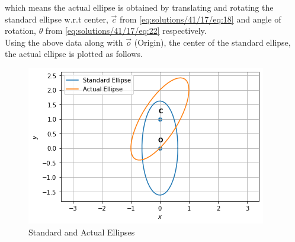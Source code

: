 which means the actual ellipse is obtained by translating and rotating the standard ellipse w.r.t center, $\vec{c}$ from \eqref{eq:solutions/41/17/eq:18} and angle of rotation, $\theta$ from \eqref{eq:solutions/41/17/eq:22} respectively.\\
Using the above data along with $\vec{o}$ (Origin), the center of the standard ellipse, the actual ellipse is plotted as follows.  
\begin{figure}[!ht]
    \includegraphics[width=\columnwidth]{solutions/41/17/Figure.png}
    \caption{Standard and Actual Ellipses}
    \label{eq:solutions/41/17/Fig.1}
\end{figure}
